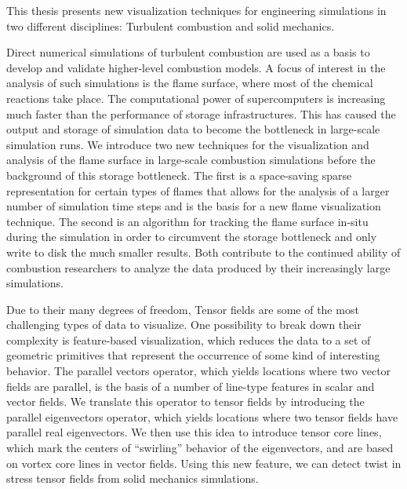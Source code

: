 %
This thesis presents new visualization techniques for engineering simulations in
two different disciplines: Turbulent combustion and solid mechanics.
%

%
Direct numerical simulations of turbulent combustion are used as a basis to
develop and validate higher-level combustion models.
%
A focus of interest in the analysis of such simulations is the flame surface,
where most of the chemical reactions take place.
%
The computational power of supercomputers is increasing much faster than the
performance of storage infrastructures.
%
This has caused the output and storage of simulation data to become the
bottleneck in large-scale simulation runs.
%
We introduce two new techniques for the visualization and analysis of the flame
surface in large-scale combustion simulations before the background of this
storage bottleneck.
%
The first is a space-saving sparse representation for certain types of flames
that allows for the analysis of a larger number of simulation time steps and is
the basis for a new flame visualization technique.
%
The second is an algorithm for tracking the flame surface in-situ during the
simulation in order to circumvent the storage bottleneck and only write to disk
the much smaller results.
%
Both contribute to the continued ability of combustion researchers to analyze
the data produced by their increasingly large simulations.
%

%
Due to their many degrees of freedom, Tensor fields are some of the most
challenging types of data to visualize.
%
One possibility to break down their complexity is feature-based visualization,
which reduces the data to a set of geometric primitives that represent the
occurrence of some kind of interesting behavior.
%
The parallel vectors operator, which yields locations where two vector fields
are parallel, is the basis of a number of line-type features in scalar and
vector fields.
%
We translate this operator to tensor fields by introducing the parallel
eigenvectors operator, which yields locations where two tensor fields have
parallel real eigenvectors.
%
We then use this idea to introduce tensor core lines, which mark the centers of
``swirling'' behavior of the eigenvectors, and are based on vortex core lines in
vector fields.
%
Using this new feature, we can detect twist in stress tensor fields from solid
mechanics simulations.
%